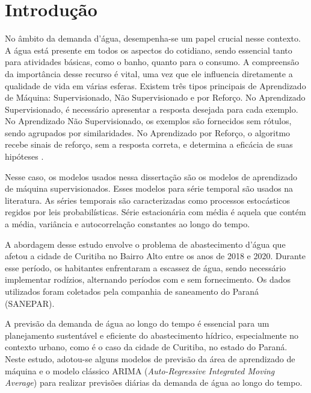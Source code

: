 



\section{Introdu{\c c}{\~a}o} \label{sec:int}



No âmbito da demanda d'água, desempenha-se um papel crucial nesse contexto. A água está presente em todos os aspectos do cotidiano, sendo essencial tanto para atividades básicas, como o banho, quanto para o consumo. A compreensão da importância desse recurso é vital, uma vez que ele influencia diretamente a qualidade de vida em várias esferas.
Existem três tipos principais de Aprendizado de Máquina: Supervisionado, Não Supervisionado e por Reforço. No Aprendizado Supervisionado, é necessário apresentar a resposta desejada para cada exemplo. No Aprendizado Não Supervisionado, os exemplos são fornecidos sem rótulos, sendo agrupados por similaridades. No Aprendizado por Reforço, o algoritmo recebe sinais de reforço, sem a resposta correta, e determina a eficácia de suas hipóteses \cite{Silva2021}.

Nesse caso, os modelos usados nessa dissertação são os modelos de aprendizado de máquina supervisionados. Esses modelos para série temporal são usados na literatura.
As séries temporais são caracterizadas como processos estocásticos regidos por leis probabilísticas.
Série estacionária com média é aquela que contém a média, variância e autocorrelação constantes ao longo do tempo.

A abordagem desse estudo envolve o problema de abastecimento d'água que afetou a cidade de Curitiba no Bairro Alto entre os anos de 2018 e 2020. Durante esse período, os habitantes enfrentaram a escassez de água, sendo necessário implementar rodízios, alternando períodos com e sem fornecimento. Os dados utilizados foram coletados pela companhia de saneamento do Paraná (SANEPAR).


A previsão da demanda de água ao longo do tempo é essencial para um planejamento sustentável e eficiente do abastecimento hídrico, especialmente no contexto urbano, como é o caso da cidade de Curitiba, no estado do Paraná. Neste estudo, adotou-se alguns modelos de previsão da área de aprendizado de máquina e o modelo clássico ARIMA (\textit{Auto-Regressive Integrated Moving Average}) para realizar previsões diárias da demanda de água ao longo do tempo.

